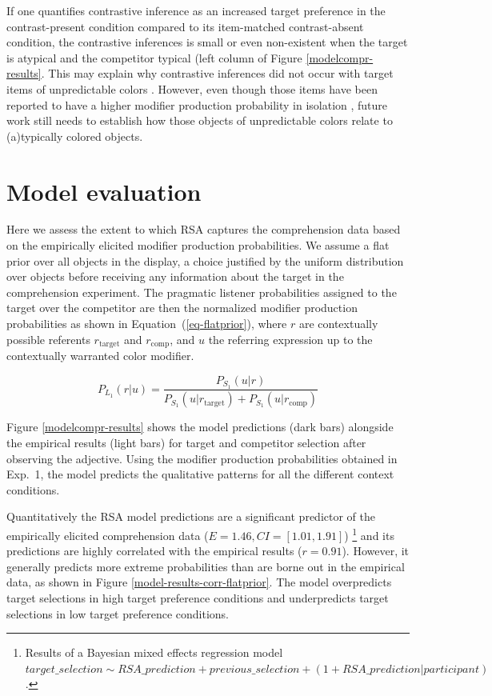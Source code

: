 \documentclass[10pt,letterpaper]{article}
\newcommand{\figref}[1]{Figure \ref{#1}}
\begin{document}
If one quantifies contrastive inference as an increased target preference in the contrast-present condition compared to its item-matched contrast-absent condition, the contrastive inferences is small or even non-existent when the target is atypical and the competitor typical (left column of \figref{modelcompr-results}. This may explain why contrastive inferences did not occur with target items of unpredictable colors \cite{Sedivy:2003}. However, even though those items have been reported to have a higher modifier production probability in isolation \cite{Sedivy:2003}, future work still needs to establish how those objects of unpredictable colors relate to (a)typically colored objects.

\section{Model evaluation}

Here we assess the extent to which RSA captures the comprehension data based on the empirically elicited modifier production probabilities. We assume a flat prior over all objects in the display, a choice justified by the uniform distribution over objects before receiving any information about the target in the comprehension experiment. The pragmatic listener probabilities assigned to the target over the competitor are then the normalized modifier production probabilities as shown in Equation~(\ref{eq-flatprior}), where $r$ are contextually possible referents $r_{\text{target}}$ and $r_{\text{comp}}$, and $u$ the referring expression up to the contextually warranted color modifier.

\begin{equation}
	P_{L_1}(r|u) = \frac{P_{S_1}(u|r)}{P_{S_1}(u|r_{\text{target}}) + P_{S_1}(u|r_{\text{comp}})}
\label{eq-flatprior}
\end{equation}

\figref{modelcompr-results} shows the model predictions (dark bars) alongside the empirical results (light bars) for target and competitor selection after observing the adjective. Using the modifier production probabilities obtained in Exp.~1, the model predicts the qualitative patterns for all the different context conditions. 

Quantitatively the RSA model predictions are a significant predictor of the empirically elicited comprehension data ($E=1.46, CI=[1.01, 1.91]$)
\footnote{Results of a Bayesian mixed effects regression model $target\_selection \sim RSA\_prediction + previous\_selection + (1+RSA\_prediction|participant)$.} 
and its predictions are highly correlated with the empirical results ($r=0.91$). However, it generally predicts more extreme probabilities than are borne out in the empirical data, as shown in \figref{model-results-corr-flatprior}. The model overpredicts target selections in high target preference conditions and underpredicts target selections in low target preference conditions. 
\end{document}
